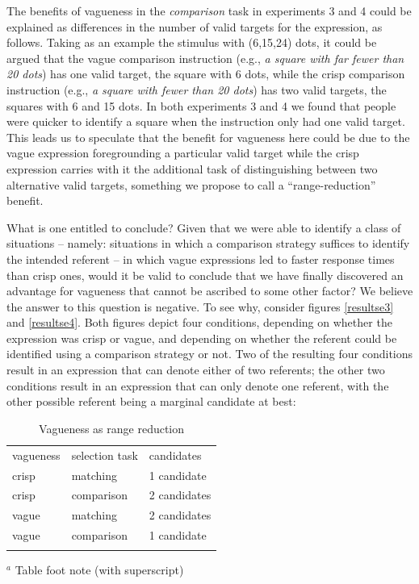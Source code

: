 \documentclass[graybox,envcountchap,sectrefs%
,footinfo
]{svmono}
\begin{document}
The benefits of vagueness in the \emph{comparison} task in experiments 3 and 4 could be explained as differences in the number of valid targets for the expression, as follows. Taking as an example the stimulus with (6,15,24) dots, it could be argued that the vague comparison instruction (e.g., \emph{a square with far fewer than 20 dots}) has one valid target, the square with 6 dots, while the crisp comparison instruction (e.g., \emph{a square with fewer than 20 dots}) has two valid targets, the squares with 6 and 15 dots. In both experiments 3 and 4 we found that people were quicker to identify a square when the instruction only had one valid target. This leads us to speculate that the benefit for vagueness here could be due to the vague expression foregrounding a particular valid target while the crisp expression carries with it the additional task of distinguishing between two alternative valid targets, something we propose to call a ``range-reduction'' benefit.

What is one entitled to conclude? Given that we were able to identify a class of situations -- namely: situations in which a comparison strategy suffices to identify the intended referent -- in which vague expressions led to faster response times than crisp ones, would it be valid to conclude that we have finally discovered an advantage for vagueness that cannot be ascribed to some other factor? We believe the answer to this question is negative. To see why, consider figures \ref{resultse3} and \ref{resultse4}. Both figures depict four conditions, depending on whether the expression was crisp or vague, and depending on whether the referent could be identified using a comparison strategy or not. Two of the resulting four conditions result in an expression that can denote either of two referents; the other two conditions result in an expression that can only denote one referent, with the other possible referent being a marginal candidate at best:

\begin{table}
\caption{Vagueness as range reduction}
\label{vaguenessasrangereduction} 
\begin{tabular}{lll}
\hline\noalign{\smallskip}
vagueness & selection task & candidates\\
\noalign{\smallskip}\svhline\noalign{\smallskip}
crisp 	& matching 	& 1 candidate\\
crisp 	& comparison 	& 2 candidates\\
vague 	& matching 	& 2 candidates\\
vague 	& comparison 	& 1 candidate\\
\noalign{\smallskip}\hline\noalign{\smallskip}
\end{tabular}
$^a$ Table foot note (with superscript)\\
\end{table}
\end{document}
